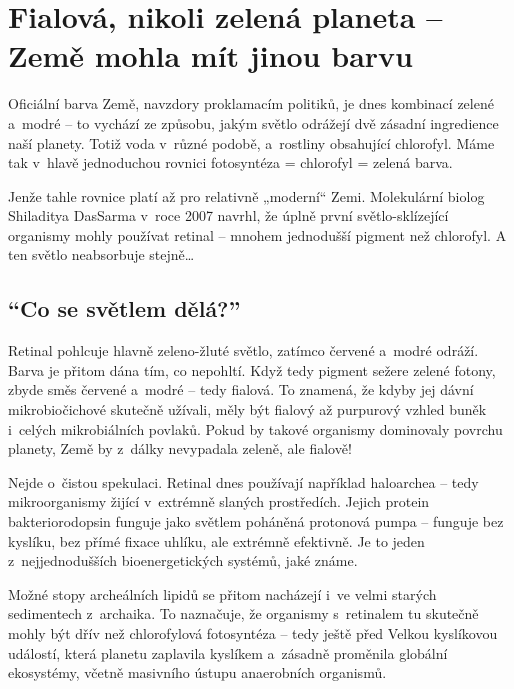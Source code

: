 \documentclass[main.tex]{subfiles}
\begin{document}
\section{Fialová, nikoli zelená planeta – Země mohla mít jinou barvu}
Oficiální barva Země, navzdory proklamacím politiků, je dnes kombinací zelené a~modré – to vychází ze způsobu, jakým světlo odrážejí dvě zásadní ingredience naší planety. Totiž voda v~různé podobě, a~rostliny obsahující chlorofyl. Máme tak v~hlavě jednoduchou rovnici fotosyntéza = chlorofyl = zelená barva.\par
Jenže tahle rovnice platí až pro relativně „moderní“ Zemi. Molekulární biolog Shiladitya DasSarma v~roce 2007 navrhl, že úplně první světlo-sklízející organismy mohly používat retinal – mnohem jednodušší pigment než chlorofyl. A ten světlo neabsorbuje stejně…
\subsection*{\enquote{Co se světlem dělá?}}
Retinal pohlcuje hlavně zeleno-žluté světlo, zatímco červené a~modré odráží. Barva je přitom dána tím, co nepohltí. Když tedy pigment sežere zelené fotony, zbyde směs červené a~modré – tedy fialová. To znamená, že kdyby jej dávní mikrobiočichové skutečně užívali, měly být fialový až purpurový vzhled buněk i~celých mikrobiálních povlaků. Pokud by takové organismy dominovaly povrchu planety, Země by z~dálky nevypadala zeleně, ale fialově!\par
Nejde o~čistou spekulaci. Retinal dnes používají například haloarchea – tedy mikroorganismy žijící v~extrémně slaných prostředích. Jejich protein bakteriorodopsin funguje jako světlem poháněná protonová pumpa – funguje bez kyslíku, bez přímé fixace uhlíku, ale extrémně efektivně. Je to jeden z~nejjednodušších bioenergetických systémů, jaké známe.\par
Možné stopy archeálních lipidů se přitom nacházejí i~ve velmi starých sedimentech z~archaika. To naznačuje, že organismy s~retinalem tu skutečně mohly být dřív než chlorofylová fotosyntéza – tedy ještě před Velkou kyslíkovou událostí, která planetu zaplavila kyslíkem a~zásadně proměnila globální ekosystémy, včetně masivního ústupu anaerobních organismů.
\end{document}
